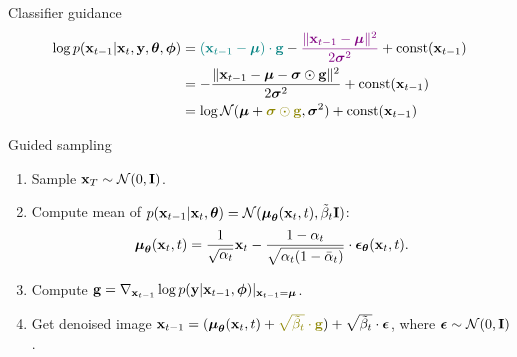 \begin{frame}{Classifier guidance}
	\vspace{-0.5cm}
	\begin{align*}
		\log p(\bx_{t - 1} | \bx_t, \by, \btheta , \bphi) &= {\color{teal}(\bx_{t-1} - \bmu) \cdot \mathbf{g}} - {\color{violet}\frac{\|\bx_{t - 1} - \bmu\|^2}{2 \bsigma^2}} + \text{const}(\bx_{t-1}) \\
		& = - \frac{\|\bx_{t - 1} - \bmu - \bsigma \odot \mathbf{g}\|^2}{2 \bsigma^2} + \text{const}(\bx_{t-1}) \\
		& = \log \cN( \bmu + {\color{olive}\bsigma \odot \mathbf{g}}, \bsigma^2) + \text{const}(\bx_{t-1})
	\end{align*}
	\vspace{-0.5cm}
	\begin{block}{Guided sampling}
		\begin{enumerate}
			\item Sample $\mathbf{x}_T \sim \mathcal{N}(0, \mathbf{I})$.
			\item Compute mean of $p(\mathbf{x}_{t-1} | \mathbf{x}_t, \boldsymbol{\theta}) = \mathcal{N}(\boldsymbol{\mu}_{\boldsymbol{\theta}}(\mathbf{x}_t, t), \tilde{\beta}_t \mathbf{I})$:
			\[
				\boldsymbol{\mu}_{\boldsymbol{\theta}}(\mathbf{x}_t, t) = \frac{1}{\sqrt{\alpha_t}} \mathbf{x}_t - \frac{1 - \alpha_t}{\sqrt{\alpha_t (1 - \bar{\alpha}_t)}} \cdot \boldsymbol{\epsilon}_{\boldsymbol{\theta}}(\mathbf{x}_t, t).
			\]
			\vspace{-0.3cm}
			\item Compute $\mathbf{g} =  \nabla_{\mathbf{x}_{t-1}} \log p(\mathbf{y} | \mathbf{x}_{t-1}, \boldsymbol{\phi}) |_{\mathbf{x}_{t-1} = \boldsymbol{\mu}}$.
			\item Get denoised image $\bx_{t - 1} = (\bmu_{\btheta}(\bx_t, t) +  {\color{olive} \sqrt{\tilde{\beta}_t} \cdot \mathbf{g}})+ \sqrt{\tilde{\beta}_t} \cdot \bepsilon$, where $\boldsymbol{\epsilon} \sim \mathcal{N}(0, \mathbf{I})$.
		\end{enumerate}
	\end{block}
\end{frame}
